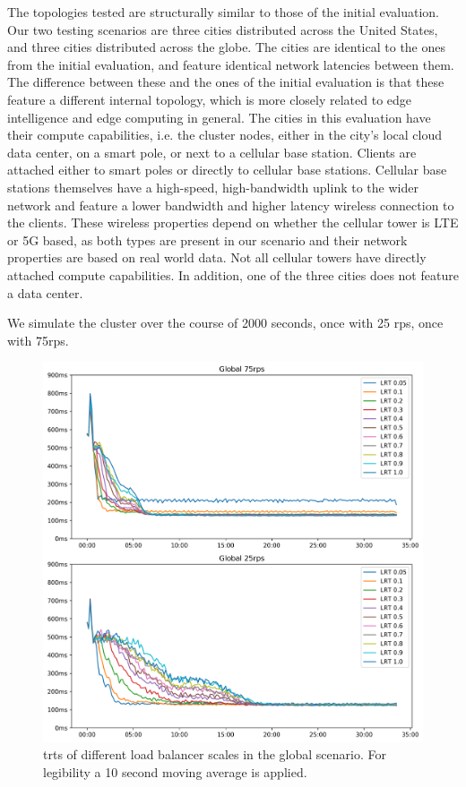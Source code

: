 The topologies tested are structurally similar to those of the initial evaluation.
Our two testing scenarios are three cities distributed across the United States, and three cities distributed across the globe.
The cities are identical to the ones from the initial evaluation, and feature identical network latencies between them.
The difference between these and the ones of the initial evaluation is that these feature a different internal topology, which is more closely related to edge intelligence\cite{rauschEdgeIntelligenceConvergence2019} and edge computing in general.
The cities in this evaluation have their compute capabilities, i.e. the cluster nodes, either in the city's local cloud data center, on a smart pole, or next to a cellular base station.
Clients are attached either to smart poles or directly to cellular base stations.
Cellular base stations themselves have a high-speed, high-bandwidth uplink to the wider network and feature a lower bandwidth and higher latency wireless connection to the clients.
These wireless properties depend on whether the cellular tower is LTE or 5G based, as both types are present in our scenario and their network properties are based on real world data\cite{braudMulticarrierMeasurementStudy2019}.
Not all cellular towers have directly attached compute capabilities.
In addition, one of the three cities does not feature a data center.

We simulate the cluster over the course of 2000 seconds, once with 25 \gls{rps}, once with 75\gls{rps}.



\begin{figure}
    \centering
    \includegraphics[width=\linewidth]{graphics/graphs/global_lb_scale.png}
    \caption{\glspl{trt} of different load balancer scales in the global scenario. For legibility a 10 second moving average is applied.}
    \label{fig:lb_scale_global}
\end{figure}


